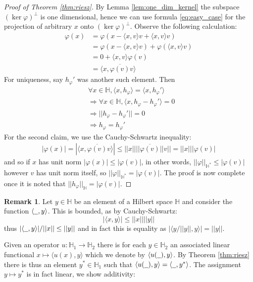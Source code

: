 \documentclass[12pt]{article}
\theoremstyle{plain}
\theoremstyle{definition}
\newtheorem{remark}[thm]{Remark}
\newcommand{\bb}[1]{\mathbb{#1}}
\newcommand{\und}[1]{\underline{\hspace{#1 cm}}}
\newcommand{\lto}{\longrightarrow}
\begin{document}
\begin{proof}[Proof of Theorem \ref{thm:riesz}]
By Lemma \ref{lem:one_dim_kernel} the subspace $(\operatorname{ker}\varphi)^\perp$ is one dimensional, hence we can use formula \eqref{eq:easy_case} for the projection of arbitrary $x$ onto $(\operatorname{ker}\varphi)^\perp$. Observe the following calculation:
\begin{align*}
    \varphi(x) &= \varphi(x - \langle x,v\rangle v + \langle x,v\rangle v)\\
    &= \varphi(x - \langle x,v\rangle v) + \varphi(\langle x,v\rangle v)\\
    &= 0 + \langle x,v\rangle\varphi(v)\\
    &= \langle x, \overline{\varphi(v)}v\rangle
\end{align*}
For uniqueness, say $h_\varphi'$ was another such element. Then
\begin{align*}
    &\forall x \in \bb{H}, \langle x, h_\varphi\rangle = \langle x, h_\varphi'\rangle\\
    &\Longrightarrow \forall x \in \bb{H}, \langle x, h_\varphi - h_\varphi'\rangle = 0\\
    &\Longrightarrow|| h_\varphi - h_\varphi'|| = 0\\
    &\Longrightarrow h_\varphi = h_\varphi'
\end{align*}
For the second claim, we use the Cauchy-Schwartz inequality:
\begin{align*}
    |\varphi(x)| = |\langle x, \overline{\varphi(v)}v\rangle| \leq ||x||||\overline{\varphi(v)}||v|| = ||x|||\varphi(v)|
\end{align*}
and so if $x$ has unit norm $|\varphi(x)| \leq |\varphi(v)|$, in other words, $||\varphi||_{\bb{H}^\ast} \leq |\varphi(v)|$ however $v$ has unit norm itself, so $||\varphi||_{\bb{H}^\ast} = |\varphi(v)|$. The proof is now complete once it is noted that $||h_\varphi||_{\bb{H}} = |\varphi(v)|$.
\end{proof}
\begin{remark}
\label{rmk:bounded_inner_product} Let $y \in \bb{H}$ be an element of a Hilbert space $\bb{H}$ and consider the function $\langle \und{0.2},y\rangle$. This is bounded, as by Cauchy-Schwartz:
\[|\langle x,y\rangle| \leq ||x||||y||\]
thus $|\langle \und{0.2},y\rangle|/||x|| \leq ||y||$ and in fact this is equality as $|\langle y/||y||,y\rangle| = ||y||$.
\end{remark}
Given an operator $u: \bb{H}_1 \lto \bb{H}_2$ there is for each $y \in \bb{H}_2$ an associated linear functional $x \longmapsto \langle u(x),y\rangle$ which we denote by $\langle u(\und{0.2}),y\rangle$. By Theorem \ref{thm:riesz} there is thus an element $y^\ast \in \bb{H}_1$ such that $\langle u(\und{0.2}),y\rangle = \langle \und{0.2}, y^\ast\rangle$. The assignment $y \mapsto y^\ast$ is in fact linear, we show additivity:
\end{document}
